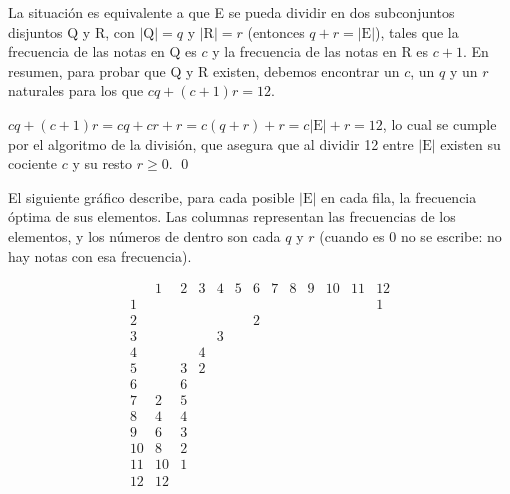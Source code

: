		La situación es equivalente a que E se pueda dividir en dos subconjuntos disjuntos Q y R, con $|\text{Q}|=q$ y $|\text{R}|=r$ (entonces $q+r=|\text{E}|$), tales que la frecuencia de las notas en Q es $c$ y la frecuencia de las notas en R es $c+1$. En resumen, para probar que Q y R existen, debemos encontrar un $c$, un $q$ y un $r$ naturales para los que $cq + (c+1)r=12$.
		
		$cq + (c+1)r =
		cq + cr + r =
		c(q+r) + r =
		c|\text{E}| + r = 12$, lo cual se cumple por el algoritmo de la división, que asegura que al dividir 12 entre $|\text{E}|$ existen su cociente $c$ y su resto $r\geq0$. \qed
		
		El siguiente gráfico describe, para cada posible $|\text{E}|$ en cada fila, la frecuencia óptima de sus elementos. Las columnas representan las frecuencias de los elementos, y los números de dentro son cada $q$ y $r$ (cuando es 0 no se escribe: no hay notas con esa frecuencia).
		
		
%			
%			
%			
	
		$$\begin{array}{l|rrrrrrrrrrrr}
		&1&2&3&4&5&6&7&8&9&10&11&12\\\hline
		1&&&&&&&&&&&&1\\\hline
		2&&&&&&2\\\hline
		3&&&&3\\\hline
		4&&&4\\\hline
		5&&3&2\\\hline
		6&&6\\\hline
		7&2&5\\\hline
		8&4&4\\\hline
		9&6&3\\\hline
		10&8&2\\\hline
		11&10&1\\\hline
		12&12&\\
		\end{array}$$
		
